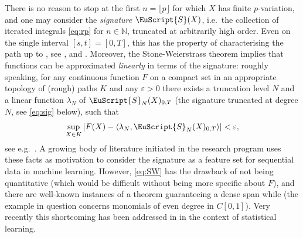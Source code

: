 \documentclass{article}
\def\Sig{\EuScript{S}}
\def\p{{\lfloor p \rfloor}}
\numberwithin{equation}{section}
\theoremstyle{definition}
\theoremstyle{remark}
\begin{document}
There is no reason to stop at the first $n = \p$ for which $X$ has finite $p$-variation, and one may consider the \emph{signature} $\Sig(X)$, i.e.\ the collection of iterated integrals \eqref{eq:rp} for $n \in \mathbb N$, truncated at arbitrarily high order. Even on the single interval $[s,t] = [0,T]$, this has the property of characterising the path up to , see \cite{chen_integration_1958}, \cite{HL10} and \cite{siguniqueness}. Moreover, the Stone-Weierstrass theorem implies that functions can be approximated \emph{linearly} in terms of the signature: roughly speaking, for any continuous function $F$ on a compact set in an appropriate topology of (rough) paths $K$ and any $\varepsilon > 0$ there exists a truncation level $N$ and a linear function $\lambda_N$ of $\Sig_N(X)_{0,T}$ (the signature truncated at degree $N$, see \eqref{eq:sig} below), such that 
\begin{equation}\label{eq:SW}
\sup_{X \in K}|F(X) - \langle \lambda_N, \Sig_N(X)_{0,T} \rangle| < \varepsilon,
\end{equation}
see e.g.\ \cite[Proposition 1]{Ferm21}. A growing body of literature initiated in the research program \cite{Lyo14} uses these facts as motivation to consider the signature as a feature set for sequential data in machine learning. However, \eqref{eq:SW} has the drawback of not being quantitative (which would be difficult without being more specific about $F$), and there are well-known instances \cite{Tref23} of a  theorem guaranteeing a dense span while  (the example in question concerns monomials of even degree in $C[0,1]$). Very recently this shortcoming has been addressed in \cite{horvath} in the context of statistical learning.
\end{document}

